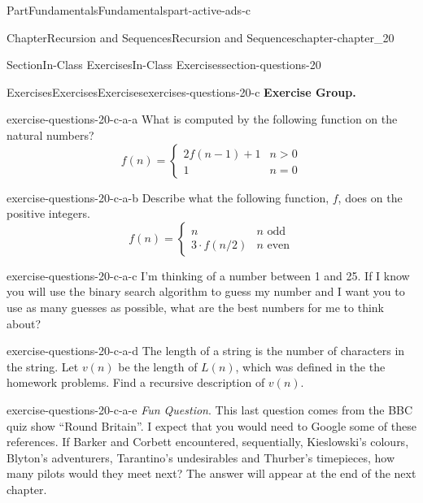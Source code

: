 \documentclass[oneside,10pt,]{book}
\numberwithin{equation}{section}
\newcommand{\gt}{>}
\begin{document}
\begin{partptx}{Part}{Fundamentals}{}{Fundamentals}{}{}{part-active-ads-c}
\begin{chapterptx}{Chapter}{Recursion and Sequences}{}{Recursion and Sequences}{}{}{chapter-chapter_20}
\begin{sectionptx}{Section}{In-Class Exercises}{}{In-Class Exercises}{}{}{section-questions-20}
\begin{exercises-subsection-numberless}{Exercises}{Exercises}{}{Exercises}{}{}{exercises-questions-20-c}
\textbf{Exercise Group.}\space\space%
\begin{exercisegroup}
\begin{divisionexerciseeg}{1}{}{}{exercise-questions-20-c-a-a}%
What is computed by the following function on the natural numbers?%
\begin{equation*}
f(n)=\begin{cases} 
2 f(n-1)+1 & n \gt 0 \\
1			 & n=0
\end{cases}
\end{equation*}
%
\end{divisionexerciseeg}%
\begin{divisionexerciseeg}{2}{}{}{exercise-questions-20-c-a-b}%
Describe what the following function, \(f\), does on the positive integers.%
\begin{equation*}
f(n)=\begin{cases} 
n & n\textrm{ odd} \\
3\cdot f(n/2) & n\textrm{ even}
\end{cases}
\end{equation*}
%
\end{divisionexerciseeg}%
\begin{divisionexerciseeg}{3}{}{}{exercise-questions-20-c-a-c}%
I'm thinking of a number between 1 and 25.  If I know you will use the binary search algorithm to guess my number and I want you to use as many guesses as possible, what are the best numbers for me to think about?%
\end{divisionexerciseeg}%
\begin{divisionexerciseeg}{4}{}{}{exercise-questions-20-c-a-d}%
The length of a string is the number of characters in the string. Let \(v(n)\) be the length of \(L(n)\), which was defined in the the homework problems.  Find a recursive description of \(v(n)\).%
\end{divisionexerciseeg}%
\begin{divisionexerciseeg}{5}{}{}{exercise-questions-20-c-a-e}%
\emph{Fun Question}.  This last question comes from the BBC quiz show ``Round Britain''. I expect that you would need to Google some of these references.  If Barker and Corbett encountered, sequentially, Kieslowski's colours, Blyton's adventurers, Tarantino's undesirables and Thurber's timepieces, how many pilots would they meet next?  The answer will appear at the end of the next chapter.%
\end{divisionexerciseeg}%
\end{exercisegroup}
\par\medskip\noindent

\end{exercises-subsection-numberless}
\end{sectionptx}
\end{chapterptx}
\end{partptx}
\end{document}
